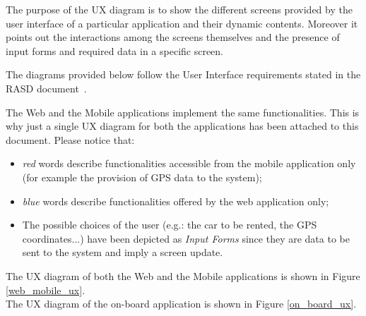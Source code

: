 The purpose of the UX diagram is to show the different screens provided by the user interface of a particular application and their dynamic contents. Moreover it points out the interactions among the screens themselves and the presence of input forms and required data in a specific screen.

The diagrams provided below follow the User Interface requirements stated in the RASD document~\cite{rasd}.

The Web and the Mobile applications implement the same functionalities. This is why just a single UX diagram for both the applications has been attached to this document. Please notice that:
\begin{itemize}
\item \emph{\color{red} red} words describe functionalities accessible from the mobile application only (for example the provision of GPS data to the system);
\item \emph{\color{blue} blue} words describe functionalities offered by the web application only;
\item The possible choices of the user (e.g.: the car to be rented, the GPS coordinates...) have been depicted as \emph{Input Forms} since they are data to be sent to the system and imply a screen update.
\end{itemize}
The UX diagram of both the Web and the Mobile applications is shown in Figure \ref{web_mobile_ux}. \\
The UX diagram of the on-board application is shown in Figure \ref{on_board_ux}.

